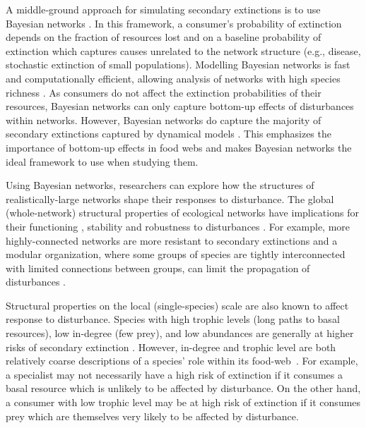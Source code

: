 \documentclass[12pt]{article}
\begin{document}
\begin{spacing}{2.0}
    
    A middle‐ground approach for simulating secondary extinctions is to use  Bayesian networks \citep{Eklof2013}. 
    In this framework, a consumer's probability of extinction depends on the fraction of resources lost and on a baseline probability of extinction which captures causes unrelated to the network structure (e.g., disease, stochastic extinction of small populations).
    Modelling Bayesian networks is fast and computationally efficient, allowing analysis of networks with high species richness \citep{Haussler2020}. 
    As consumers do not affect the extinction probabilities of their resources, Bayesian networks can only capture bottom-up effects of disturbances within networks. 
    However, Bayesian networks do capture the majority of secondary extinctions captured by dynamical models \citep{Eklof2013}.
    This emphasizes the importance of bottom-up effects in food webs and makes Bayesian networks the ideal framework to use when studying them.  

    Using Bayesian networks, researchers can explore how the structures of realistically-large networks shape their responses to disturbance.
    The global (whole-network) structural properties of ecological networks have implications for their functioning \citep{Petchey2002}, stability \citep{Allesina2012} and robustness to disturbances \citep{Dunne2002, Eklof2006}. 
    For example, more highly-connected networks are more resistant to secondary extinctions \citep{Dunne2002, Eklof2006} and a modular organization, where some groups of species are tightly interconnected with limited connections between groups, can limit the propagation of disturbances \citep{Krause2003, Teng2004}.
    
    Structural properties on the local (single-species) scale are also known to affect response to disturbance. 
    Species with high trophic levels (long paths to basal resources), low in-degree (few prey), and low abundances are generally at higher risks of secondary extinction \citep{binzer2011susceptibility}. 
    However, in-degree and trophic level are both relatively coarse descriptions of a species' role within its food-web~\citep{Cirtwill2018FoodWebs}. 
    For example, a specialist may not necessarily have a high risk of extinction if it consumes a basal resource which is unlikely to be affected by disturbance. 
    On the other hand, a consumer with low trophic level may be at high risk of extinction if it consumes prey which are themselves very likely to be affected by disturbance. 
    

\end{spacing}
\end{document}
